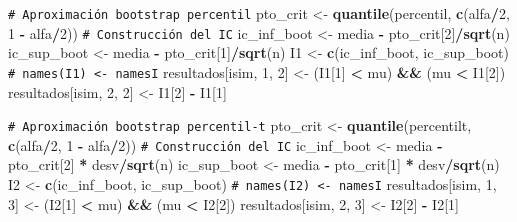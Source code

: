 \documentclass[
]{book}
\newenvironment{Shaded}{\begin{snugshade}}{\end{snugshade}}
\newcommand{\CommentTok}[1]{\textcolor[rgb]{0.56,0.35,0.01}{\textit{#1}}}
\newcommand{\DecValTok}[1]{\textcolor[rgb]{0.00,0.00,0.81}{#1}}
\newcommand{\FunctionTok}[1]{\textcolor[rgb]{0.13,0.29,0.53}{\textbf{#1}}}
\newcommand{\NormalTok}[1]{#1}
\newcommand{\OtherTok}[1]{\textcolor[rgb]{0.56,0.35,0.01}{#1}}
\newcommand{\SpecialCharTok}[1]{\textcolor[rgb]{0.81,0.36,0.00}{\textbf{#1}}}
\theoremstyle{break}
\theoremstyle{nonumberplain}
\renewcommand{\CommentTok}[1]{\textcolor[rgb]{0.41,0.41,0.41}{\texttt{#1}}}
\begin{document}
\begin{Shaded}
\begin{Highlighting}[]
    \CommentTok{\# Aproximación bootstrap percentil}
\NormalTok{    pto\_crit }\OtherTok{\textless{}{-}} \FunctionTok{quantile}\NormalTok{(percentil, }\FunctionTok{c}\NormalTok{(alfa}\SpecialCharTok{/}\DecValTok{2}\NormalTok{, }\DecValTok{1} \SpecialCharTok{{-}}\NormalTok{ alfa}\SpecialCharTok{/}\DecValTok{2}\NormalTok{))}
    \CommentTok{\# Construcción del IC}
\NormalTok{    ic\_inf\_boot }\OtherTok{\textless{}{-}}\NormalTok{ media }\SpecialCharTok{{-}}\NormalTok{ pto\_crit[}\DecValTok{2}\NormalTok{]}\SpecialCharTok{/}\FunctionTok{sqrt}\NormalTok{(n)}
\NormalTok{    ic\_sup\_boot }\OtherTok{\textless{}{-}}\NormalTok{ media }\SpecialCharTok{{-}}\NormalTok{ pto\_crit[}\DecValTok{1}\NormalTok{]}\SpecialCharTok{/}\FunctionTok{sqrt}\NormalTok{(n)}
\NormalTok{    I1 }\OtherTok{\textless{}{-}} \FunctionTok{c}\NormalTok{(ic\_inf\_boot, ic\_sup\_boot)}
    \CommentTok{\# names(I1) \textless{}{-} namesI}
\NormalTok{    resultados[isim, }\DecValTok{1}\NormalTok{, }\DecValTok{2}\NormalTok{] }\OtherTok{\textless{}{-}}\NormalTok{ (I1[}\DecValTok{1}\NormalTok{] }\SpecialCharTok{\textless{}}\NormalTok{ mu) }\SpecialCharTok{\&\&}\NormalTok{ (mu }\SpecialCharTok{\textless{}}\NormalTok{ I1[}\DecValTok{2}\NormalTok{])}
\NormalTok{    resultados[isim, }\DecValTok{2}\NormalTok{, }\DecValTok{2}\NormalTok{] }\OtherTok{\textless{}{-}}\NormalTok{ I1[}\DecValTok{2}\NormalTok{] }\SpecialCharTok{{-}}\NormalTok{ I1[}\DecValTok{1}\NormalTok{]}
    
    \CommentTok{\# Aproximación bootstrap percentil{-}t}
\NormalTok{    pto\_crit }\OtherTok{\textless{}{-}} \FunctionTok{quantile}\NormalTok{(percentilt, }\FunctionTok{c}\NormalTok{(alfa}\SpecialCharTok{/}\DecValTok{2}\NormalTok{, }\DecValTok{1} \SpecialCharTok{{-}}\NormalTok{ alfa}\SpecialCharTok{/}\DecValTok{2}\NormalTok{))}
    \CommentTok{\# Construcción del IC}
\NormalTok{    ic\_inf\_boot }\OtherTok{\textless{}{-}}\NormalTok{ media }\SpecialCharTok{{-}}\NormalTok{ pto\_crit[}\DecValTok{2}\NormalTok{] }\SpecialCharTok{*}\NormalTok{ desv}\SpecialCharTok{/}\FunctionTok{sqrt}\NormalTok{(n)}
\NormalTok{    ic\_sup\_boot }\OtherTok{\textless{}{-}}\NormalTok{ media }\SpecialCharTok{{-}}\NormalTok{ pto\_crit[}\DecValTok{1}\NormalTok{] }\SpecialCharTok{*}\NormalTok{ desv}\SpecialCharTok{/}\FunctionTok{sqrt}\NormalTok{(n)}
\NormalTok{    I2 }\OtherTok{\textless{}{-}} \FunctionTok{c}\NormalTok{(ic\_inf\_boot, ic\_sup\_boot)}
    \CommentTok{\# names(I2) \textless{}{-} namesI}
\NormalTok{    resultados[isim, }\DecValTok{1}\NormalTok{, }\DecValTok{3}\NormalTok{] }\OtherTok{\textless{}{-}}\NormalTok{ (I2[}\DecValTok{1}\NormalTok{] }\SpecialCharTok{\textless{}}\NormalTok{ mu) }\SpecialCharTok{\&\&}\NormalTok{ (mu }\SpecialCharTok{\textless{}}\NormalTok{ I2[}\DecValTok{2}\NormalTok{])}
\NormalTok{    resultados[isim, }\DecValTok{2}\NormalTok{, }\DecValTok{3}\NormalTok{] }\OtherTok{\textless{}{-}}\NormalTok{ I2[}\DecValTok{2}\NormalTok{] }\SpecialCharTok{{-}}\NormalTok{ I2[}\DecValTok{1}\NormalTok{]}
    

\end{Highlighting}
\end{Shaded}
\end{document}

